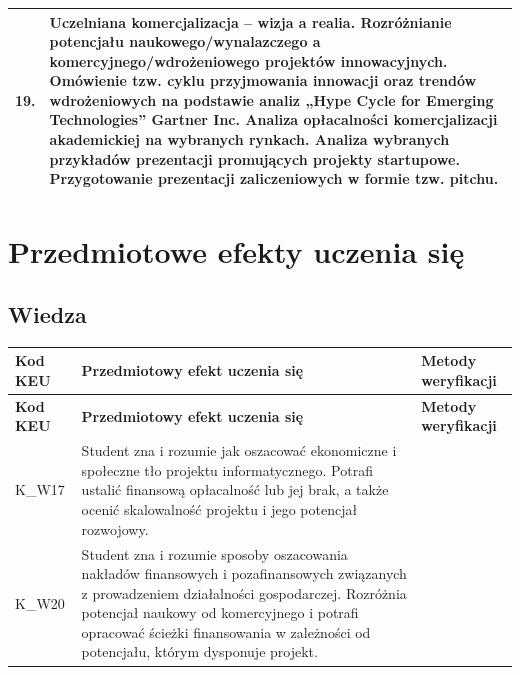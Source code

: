\documentclass[12pt, a4paper]{article}
\newcommand{\thdrule}{\noalign{\global\setlength{\extrarowheight}{0pt}}}
\newcommand{\thdend}{\noalign{\global\setlength{\extrarowheight}{3pt}}}
\begin{document}
{\begin{longtable}{m{1.5cm}m{14.5cm}}
  \rowcolor{tableRowLight} 19. & Uczelniana komercjalizacja – wizja a realia. Rozróżnianie potencjału naukowego/wynalazczego a komercyjnego/wdrożeniowego projektów innowacyjnych. Omówienie tzw. cyklu przyjmowania innowacji oraz trendów wdrożeniowych na podstawie analiz „Hype Cycle for Emerging Technologies” Gartner Inc. Analiza opłacalności komercjalizacji akademickiej na wybranych rynkach. Analiza wybranych przykładów prezentacji promujących projekty startupowe. Przygotowanie prezentacji zaliczeniowych w formie tzw. pitchu. \\
\bottomrule
\end{longtable}}

\section{Przedmiotowe efekty uczenia się}

\subsection*{Wiedza}
{\scriptsize
\begin{longtable}{m{1.6cm}m{9.0cm}m{4.2cm}}
\thdrule\toprule
\rowcolor{pjatkRed} {\color{white}\footnotesize\textbf{\vphantom{Ag}Kod KEU}} & {\color{white}\footnotesize\textbf{\vphantom{Ag}Przedmiotowy efekt uczenia się}} & {\color{white}\footnotesize\textbf{\vphantom{Ag}Metody weryfikacji}} \\
\midrule\thdend
\endfirsthead
\thdrule\toprule
\rowcolor{pjatkRed} {\color{white}\footnotesize\textbf{\vphantom{Ag}Kod KEU}} & {\color{white}\footnotesize\textbf{\vphantom{Ag}Przedmiotowy efekt uczenia się}} & {\color{white}\footnotesize\textbf{\vphantom{Ag}Metody weryfikacji}} \\
\midrule\thdend
\endhead
  \rowcolor{tableRowLight} K\_W17 & Student zna i rozumie  jak oszacować ekonomiczne i społeczne tło projektu informatycznego. Potrafi ustalić finansową opłacalność lub jej brak, a także ocenić skalowalność projektu i jego potencjał rozwojowy. &  \\
  \rowcolor{tableRowAlt} K\_W20 & Student zna i rozumie  sposoby oszacowania nakładów finansowych i pozafinansowych związanych z prowadzeniem działalności gospodarczej.  Rozróżnia potencjał naukowy od komercyjnego i potrafi opracować ścieżki finansowania w zależności od potencjału, którym dysponuje projekt. &  \\
\bottomrule
\end{longtable}}
\end{document}
